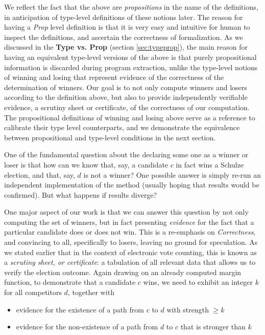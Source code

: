 \noindent
We reflect the fact that the above are \emph{propositions} in
the name of the definitions, in anticipation of type-level
definitions of these notions later. The reason for having a \textit{Prop} level definition is that 
 it is very easy  and intuitive for human to inspect the definitions, and ascertain the correctness of formalization.
As we discussed in the
\textbf{Type vs. Prop} (section \ref{sec:typeprop}), the main reason 
for having an equivalent
type-level versions of the above is that purely propositional
information is discarded during program extraction, unlike
the type-level notions of winning and losing that represent evidence
of the correctness of the determination of winners. Our goal is to 
not only compute winners and losers according to the
definition above, but also to provide independently verifiable
evidence, a scrutiny sheet or certificate, of the correctness of our computation.
The propositional
definitions of winning and losing above serve as a reference to
calibrate their type level counterparts, and we demonstrate the
equivalence between propositional and type-level conditions in the
next section. 


\label{sec:prop-type}
One of the fundamental question about the declaring some one 
as a winner or loser is that 
how can we know that, say, a candidate $c$ in fact wins a
Schulze election, and that, say, $d$ is not a winner? One possible 
answer is simply  re-run an independent implementation of the method
(usually hoping that results would be confirmed). But what happens
if results diverge?  

One major aspect of our work is that we can answer this question
by not only computing the set of winners, but in fact presenting
\emph{evidence} for the fact that a particular
candidate does or does not
win. This is a re-emphasis on \emph{Correctness},
and convincing to all, specifically to losers, leaving  no ground for speculation. 
As we stated earlier that in the context of
electronic vote counting, this is known as a
\emph{scrutiny sheet, or certificate}: a tabulation of all relevant data that allows
us to verify the election outcome.
Again drawing on an already computed margin function, to
demonstrate that a candidate $c$ wins, we need to exhibit an integer
$k$ for all competitors $d$, together with
\begin{itemize}
  \item evidence for the existence of a path from $c$ to $d$ with
  strength $\geq k$
  \item evidence for the non-existence of a path from $d$ to $c$
  that is stronger than $k$
\end{itemize}


